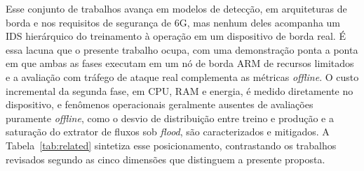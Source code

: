 \documentclass[12pt]{article}
\begin{document}
Esse conjunto de trabalhos avança em modelos de detecção, em arquiteturas de
borda e nos requisitos de segurança de 6G, mas nenhum deles acompanha um IDS
hierárquico do treinamento à operação em um dispositivo de borda real. É essa
lacuna que o presente trabalho ocupa, com uma demonstração ponta a ponta em que
ambas as fases executam em um nó de borda ARM de recursos limitados e a
avaliação com tráfego de ataque real complementa as métricas \textit{offline}.
O custo incremental da segunda fase, em CPU, RAM e energia, é medido diretamente
no dispositivo, e fenômenos operacionais geralmente ausentes de avaliações
puramente \textit{offline}, como o desvio de distribuição entre treino e
produção e a saturação do extrator de fluxos sob \textit{flood}, são
caracterizados e mitigados. A Tabela~\ref{tab:related} sintetiza esse
posicionamento, contrastando os trabalhos revisados segundo as cinco dimensões
que distinguem a presente proposta.

\begin{table}[ht]
\centering
\caption{Posicionamento do trabalho proposto frente à literatura segundo cinco dimensões de avaliação.}
\label{tab:related}
\setlength{\tabcolsep}{4pt}
\end{table}
\end{document}
